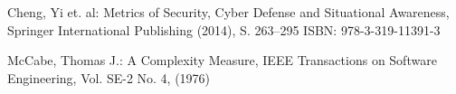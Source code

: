 
\begin{thebibliography}{8}
Cheng, Yi et. al: Metrics of Security, Cyber Defense and Situational Awareness, Springer International Publishing (2014), S. 263--295
ISBN: 978-3-319-11391-3

McCabe, Thomas J.: A Complexity Measure, IEEE Transactions on Software Engineering, Vol. SE-2 No. 4, (1976)
\end{thebibliography}
